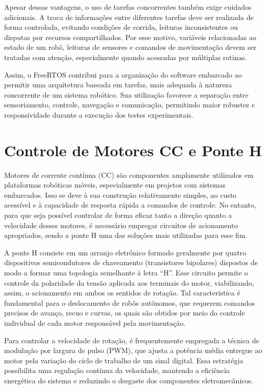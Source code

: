 \documentclass[	12pt, Times, openright, twoside, a4paper, english, brazil]{abntex2}
\begin{document}
Apesar dessas vantagens, o uso de tarefas concorrentes também exige cuidados adicionais. A troca de informações entre diferentes tarefas deve ser realizada de forma controlada, evitando condições de corrida, leituras inconsistentes ou disputas por recursos compartilhados. Por esse motivo, variáveis relacionadas ao estado de um robô, leituras de sensores e comandos de movimentação devem ser tratadas com atenção, especialmente quando acessadas por múltiplas rotinas.

Assim, o FreeRTOS contribui para a organização do software embarcado ao permitir uma arquitetura baseada em tarefas, mais adequada à natureza concorrente de um sistema robótico. Sua utilização favorece a separação entre sensoriamento, controle, navegação e comunicação, permitindo maior robustez e responsividade durante a execução dos testes experimentais.

\section{Controle de Motores CC e Ponte H} \label{sec:controle_motores}

Motores de corrente contínua (CC) são componentes amplamente utilizados em plataformas robóticas móveis, especialmente em projetos com sistemas embarcados. Isso se deve à sua construção relativamente simples, ao custo acessível e à capacidade de resposta rápida a comandos de controle. No entanto, para que seja possível controlar de forma eficaz tanto a direção quanto a velocidade desses motores, é necessário empregar circuitos de acionamento apropriados, sendo a ponte H uma das soluções mais utilizadas para esse fim.

A ponte H consiste em um arranjo eletrônico formado geralmente por quatro dispositivos semicondutores de chaveamento (transistores bipolares) dispostos de modo a formar uma topologia semelhante à letra “H”. Esse circuito permite o controle da polaridade da tensão aplicada aos terminais do motor, viabilizando, assim, o acionamento em ambos os sentidos de rotação. Tal característica é fundamental para o deslocamento de robôs autônomos, que requerem comandos precisos de avanço, recuo e curvas, os quais são obtidos por meio do controle individual de cada motor responsável pela movimentação.

Para controlar a velocidade de rotação, é frequentemente empregada a técnica de modulação por largura de pulso (PWM), que ajusta a potência média entregue ao motor pela variação do ciclo de trabalho de um sinal digital. Essa estratégia possibilita uma regulação contínua da velocidade, mantendo a eficiência energética do sistema e reduzindo o desgaste dos componentes eletromecânicos.
\end{document}
